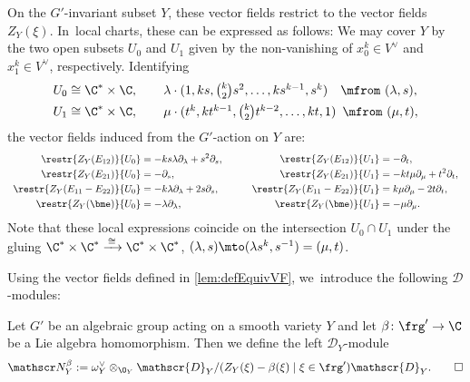 \begin{exa}
On the $G'$-invariant subset $Y$, these vector fields restrict to the vector fields $Z_Y(\xi)$. In~local charts, these can be expressed as follows: We may cover $Y$ by the two open subsets $U_0$ and $U_1$ given by the non-vanishing of $x_0^k \in V^\vee$ and $x_1^k \in V^\vee$, respectively. Identifying
\begin{align*}
U_0 &\cong \C^* \times \C, \qquad
\lambda \cdot {\textstyle(1,ks, \binom{k}{2}s^2,\dots,ks^{k-1},s^k)} \quad \mfrom \ (\lambda,s), \\
U_1 &\cong \C^* \times \C, \qquad
\mu \cdot {\textstyle(t^k,kt^{k-1},\binom{k}{2}t^{k-2},\dots,kt,1)} \ \, \mfrom \ (\mu,t),
\end{align*}
the vector fields induced from the $G'$-action on $Y$ are:
\[
\begin{array}{c@{\hspace{3em}}c}
\begin{aligned}
\restr{Z_Y(E_{12})}{U_0} &= -ks \lambda \partial_\lambda + s^2 \partial_s, \\
\restr{Z_Y(E_{21})}{U_0} &= -\partial_s, \\
\restr{Z_Y(E_{11}-E_{22})}{U_0} &= -k \lambda \partial_\lambda + 2 s \partial_s, \\
\restr{Z_Y(\bme)}{U_0} &= -\lambda \partial_\lambda,
\end{aligned} &
\begin{aligned}
\restr{Z_Y(E_{12})}{U_1} &= -\partial_t,\\
\restr{Z_Y(E_{21})}{U_1} &= -kt \mu \partial_\mu + t^2 \partial_t,\\
\restr{Z_Y(E_{11}-E_{22})}{U_1} &= k \mu \partial_\mu - 2 t \partial_t, \\
\restr{Z_Y(\bme)}{U_1} &= -\mu \partial_\mu.
\end{aligned}
\end{array}
\]
Note that these local expressions coincide on the intersection $U_0 \cap U_1$ under the gluing
$\C^* \times \C^* \xrightarrow{\,\cong\,} \C^* \times \C^*$, $(\lambda,s) \mto (\lambda s^k, s^{-1}) = (\mu,t)$.
\end{exa}

Using the vector fields defined in \cref{lem:defEquivVF}, we~introduce the following $\mathscr{D}$\nobreakdash-mod\-ules:

\begin{dfn} \label{def:NBeta}
Let $G'$ be an algebraic group acting on a smooth variety $Y$ and let $\beta \colon \frg' \to \C$ be a Lie algebra homomorphism. Then we define the left $\mathscr{D}_Y$\nobreakdash-mod\-ule
\[
\mathscr N_Y^\beta := \omega_Y^\vee \otimes_{\O_Y} \mathscr{D}_Y/(Z_Y(\xi)-\beta(\xi) \mid \xi \in \frg')\mathscr{D}_Y. \qedhere
\]
\end{dfn}

